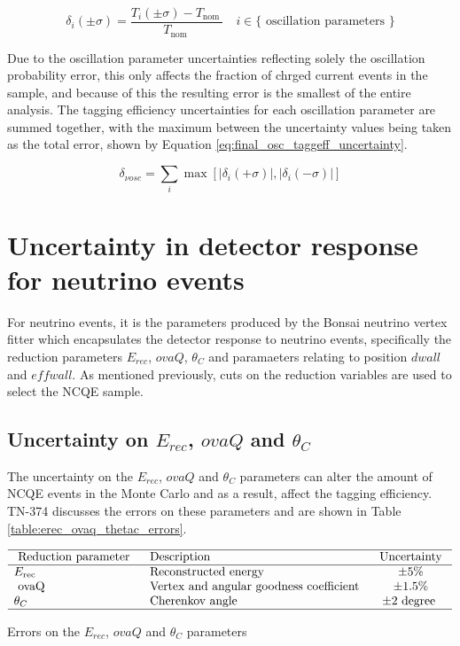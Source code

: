 \begin{equation}
    \delta_i(\pm \sigma)=\frac{T_i(\pm \sigma)-T_{\text {nom }}}{T_{\text {nom }}} \quad i \in\{\text { oscillation parameters }\}
\label{eq:osc_tageff_uncertainty}
\end{equation}

Due to the oscillation parameter uncertainties reflecting solely the oscillation probability error, this only affects the fraction of chrged current events in the sample, and because of this the resulting error is the smallest of the entire analysis. The tagging efficiency uncertainties for each oscillation parameter are summed together, with the maximum between the uncertainty values being taken as the total error, shown by Equation \ref{eq:final_osc_taggeff_uncertainty}.

\begin{equation}
    \delta_{\nu o s c}=\sum_i \max \left[\left|\delta_i(+\sigma)\right|,\left|\delta_i(-\sigma)\right|\right]
    \label{eq:final_osc_taggeff_uncertainty}
\end{equation}

\section{Uncertainty in detector response for neutrino events}

For neutrino events, it is the parameters produced by the Bonsai neutrino vertex fitter which encapsulates the detector response to neutrino events, specifically the reduction parameters $E_{rec}$, $ovaQ$, $\theta_{C}$ and paramaeters relating to position $dwall$ and $effwall$. As mentioned previously, cuts on the reduction variables are used to select the NCQE sample.

\subsection{Uncertainty on $E_{rec}$, $ovaQ$ and $\theta_{C}$}

The uncertainty on the $E_{rec}$, $ovaQ$ and $\theta_{C}$ parameters can alter the amount of NCQE events in the Monte Carlo and as a result, affect the tagging efficiency. TN-374 discusses the errors on these parameters \cite{tn_374} and are shown in Table \ref{table:erec_ovaq_thetac_errors}. 

\begin{table}
    $$
    \begin{array}{llc}
    \hline \text { Reduction parameter } & \text { Description } & \text { Uncertainty } \\
    \hline E_{\text {rec }} & \text { Reconstructed energy } & \pm 5 \% \\
    \text { ovaQ } & \text { Vertex and angular goodness coefficient } & \pm 1.5 \% \\
    \theta_C & \text { Cherenkov angle } & \pm 2 \text { degree } \\
    \hline
    \end{array}
    $$
\caption{Errors on the $E_{rec}$, $ovaQ$ and $\theta_{C}$ parameters} 
\label{table:erec_ovaq_thetac_errors} 
\end{table}

